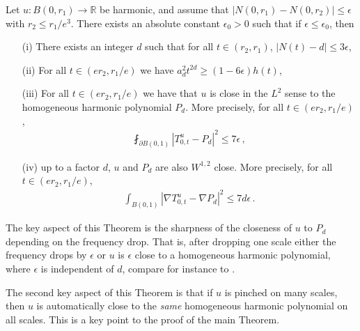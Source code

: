 \documentclass[11pt]{article}
\begin{document}
\begin{theorem}\label{th_hNpinch}\label{t:eff_tan_con_uniq_harm}
 Let $u:B(0,r_1)\to {\mathbb{R}}$ be harmonic, and assume that $\big|N(0,r_1)-N(0,r_2)\big| \leq \epsilon$ with $r_2\leq r_1/e^3$. There exists an absolute constant $\epsilon_0>0$ such that if $\epsilon \leq \epsilon_0$, then
 \begin{enumerate}
  \item[(i)] There exists an integer $d$ such that for all $t\in (r_2,r_1)$, ${\left|{ N(t)-d}\right|}\leq 3\epsilon$,
  \item[(ii)] For all $t\in (er_2,r_1/e)$ we have $a_d^2 t^{2d} \geq (1-6\epsilon) h(t)$,
  \item[(iii)] For all $t\in (er_2,r_1/e)$ we have that $u$ is close in the $L^2$ sense to the homogeneous harmonic polynomial $P_d$. More precisely, for all $t\in (e r_2,r_1/e)$,
   \begin{gather}
    \fint_{\partial B(0,1)} {\left|{T_{0,t}^u - P_d}\right|}^2 \leq 7\epsilon\, ,
   \end{gather}
  \item[(iv)] up to a factor $d$, $u$ and $P_d$ are also $W^{1,2}$ close. More precisely, for all $t\in (e r_2,r_1/e)$,
     \begin{gather}
    \int_{B(0,1)} {\left|{\nabla T_{0,t}^u - \nabla P_d}\right|}^2\leq 7d\epsilon\, .
   \end{gather}
 \end{enumerate}
\end{theorem}
\begin{remark}
The key aspect of this Theorem is the sharpness of the closeness of $u$ to $P_d$ depending on the frequency drop.  That is, after dropping one scale either the frequency drops by $\epsilon$ or $u$ is $\epsilon$ close to a homogeneous harmonic polynomial, where $\epsilon$ is independent of $d$, compare for instance to \cite{chnava}.
\end{remark}
\begin{remark}
The second key aspect of this Theorem is that if $u$ is pinched on many scales, then $u$ is automatically close to the {\it same} homogeneous harmonic polynomial on all scales.  This is a key point to the proof of the main Theorem.
\end{remark}
\end{document}

